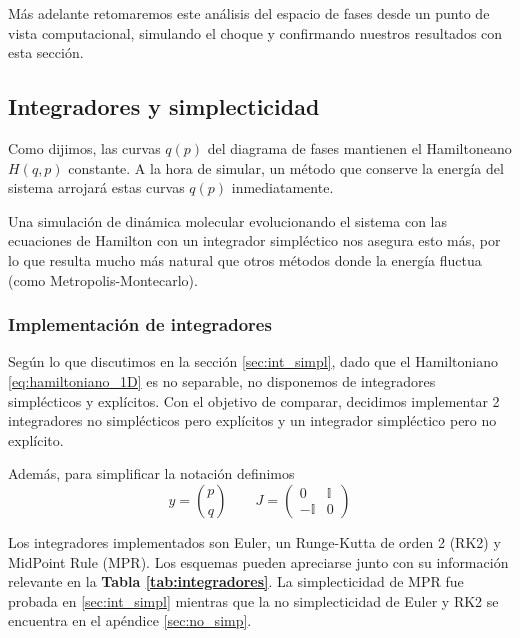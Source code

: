\begin{figure}
\end{figure}

Más adelante retomaremos este análisis del espacio de fases desde un punto de vista computacional, simulando el choque y confirmando nuestros resultados con esta sección.




\subsection{Integradores y simplecticidad}

Como dijimos, las curvas $q(p)$ del diagrama de fases mantienen el Hamiltoneano $H(q,p)$ constante.
A la hora de simular, un método que conserve la energía del sistema arrojará estas curvas $q(p)$ inmediatamente.

Una simulación de dinámica molecular evolucionando el sistema con las ecuaciones de Hamilton con un integrador simpléctico nos asegura esto más, por lo que resulta mucho más natural que otros métodos donde la energía fluctua (como Metropolis-Montecarlo).

\subsubsection{Implementación de integradores}

Según lo que discutimos en la sección \ref{sec:int_simpl}, dado que el Hamiltoniano \eqref{eq:hamiltoniano_1D} es no separable, no disponemos de integradores simplécticos y explícitos.
Con el objetivo de comparar, decidimos implementar 2 integradores no simplécticos pero explícitos y un integrador simpléctico pero no explícito.

Además, para simplificar la notación definimos \[y = \binom{p}{q} \qquad J = \begin{pmatrix}
0 & \mathbb{I} \\
-\mathbb{I} & 0
\end{pmatrix}
\]

Los integradores implementados son Euler, un Runge-Kutta de orden 2 (RK2) y MidPoint Rule (MPR).
Los esquemas pueden apreciarse junto con su información relevante en la \textbf{Tabla \ref{tab:integradores}}. 
La simplecticidad de MPR fue probada en \ref{sec:int_simpl} mientras que la no simplecticidad de Euler y RK2 se encuentra en el apéndice \ref{sec:no_simp}.

